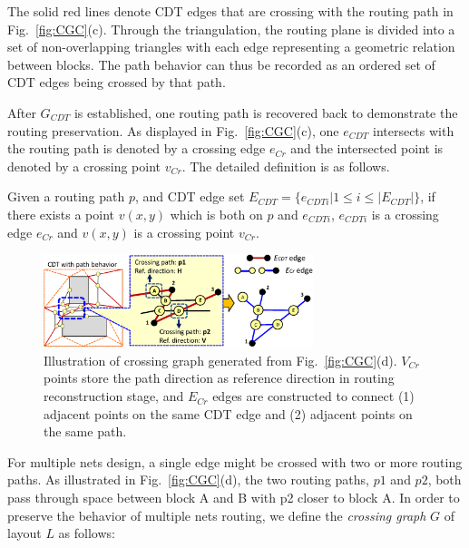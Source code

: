       The solid red lines denote CDT edges that are crossing with the routing path in Fig.~\ref{fig:CGC}(c). Through the triangulation, the routing plane is divided into a set of non-overlapping triangles with each edge representing a geometric relation between blocks. The path behavior can thus be recorded as an ordered set of CDT edges being crossed by that path.

      After $G_{CDT}$ is established, one routing path is recovered back to demonstrate the routing preservation. As displayed in Fig.~\ref{fig:CGC}(c), one $e_{CDT}$ intersects with the routing path is denoted by a crossing edge $e_{Cr}$ and the intersected point is denoted by a crossing point $v_{Cr}$. The detailed definition is as follows.

      \begin{defi}\label{defi:CrossingPoint}
        Given a routing path $p$, and CDT edge set $E_{CDT}= \{e_{CDTi}| 1 \leq i\leq|E_{CDT}|\}$, if there exists a point $v(x,y)$ which is both on $p$ and $e_{CDTi}$, $e_{CDTi}$ is a crossing edge $e_{Cr}$ and $v(x,y)$ is a crossing point $v_{Cr}$.
      \end{defi}

      \begin{figure}
        \begin{center}
        \includegraphics[width=0.7\textwidth]{Fig/Chapter4/CrG.eps}
        \caption{Illustration of crossing graph generated from Fig.~\ref{fig:CGC}(d).
          $V_{Cr}$ points store the path direction as reference direction in routing reconstruction stage, 
          and $E_{Cr}$ edges are constructed to connect (1) adjacent points on the same CDT edge and (2) adjacent points on the same path.}
        \label{fig:CrG}
        \end{center}
      \end{figure}


      For multiple nets design, a single edge might be crossed with two or more routing paths. As illustrated in Fig.~\ref{fig:CGC}(d), the two routing paths, $p1$ and $p2$, both pass through space between block A and B with p2 closer to block A. In order to preserve the behavior of multiple nets routing, we define the {\it crossing graph} $G$ of layout $L$ as follows: 

